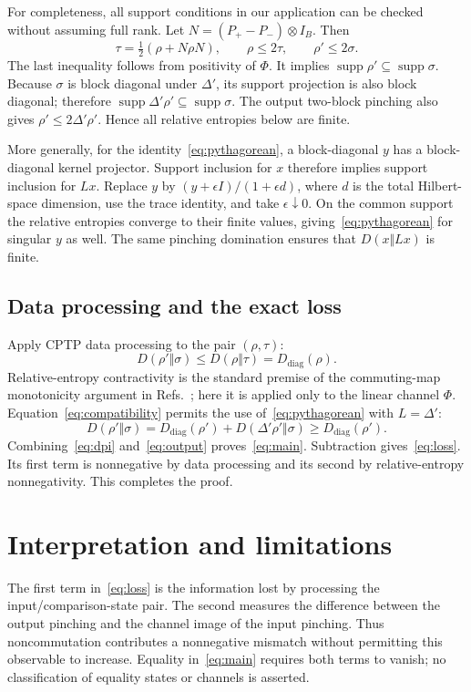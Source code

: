 \documentclass[12pt]{article}
\newcommand{\supp}{\operatorname{supp}}
\newcommand{\dd}{D_{\mathrm{diag}}}
\begin{document}
For completeness, all support conditions in our application can be checked without assuming full rank. Let $N=(P_+-P_-)\otimes I_B$. Then
\begin{equation}
 \tau=\tfrac12(\rho+N\rho N),\qquad
 \rho\leq2\tau,\qquad \rho'\leq2\sigma.
 \label{eq:domination}
\end{equation}
The last inequality follows from positivity of $\Phi$. It implies $\supp\rho'\subseteq\supp\sigma$. Because $\sigma$ is block diagonal under $\Delta'$, its support projection is also block diagonal; therefore $\supp\Delta'\rho'\subseteq\supp\sigma$. The output two-block pinching also gives $\rho'\leq2\Delta'\rho'$. Hence all relative entropies below are finite.

More generally, for the identity~\eqref{eq:pythagorean}, a block-diagonal $y$ has a block-diagonal kernel projector. Support inclusion for $x$ therefore implies support inclusion for $Lx$. Replace $y$ by $(y+\epsilon I)/(1+\epsilon d)$, where $d$ is the total Hilbert-space dimension, use the trace identity, and take $\epsilon\downarrow0$. On the common support the relative entropies converge to their finite values, giving~\eqref{eq:pythagorean} for singular $y$ as well. The same pinching domination ensures that $D(x\Vert Lx)$ is finite.

\subsection{Data processing and the exact loss}
Apply CPTP data processing to the pair $(\rho,\tau)$:
\begin{equation}
 D(\rho'\Vert\sigma)\leq D(\rho\Vert\tau)=\dd(\rho).
 \label{eq:dpi}
\end{equation}
Relative-entropy contractivity is the standard premise of the commuting-map monotonicity argument in Refs.~\cite{Liu2019,Liu2017}; here it is applied only to the linear channel $\Phi$. Equation~\eqref{eq:compatibility} permits the use of~\eqref{eq:pythagorean} with $L=\Delta'$:
\begin{equation}
 D(\rho'\Vert\sigma)=\dd(\rho')+D(\Delta'\rho'\Vert\sigma)
 \geq\dd(\rho').
 \label{eq:output}
\end{equation}
Combining~\eqref{eq:dpi} and~\eqref{eq:output} proves~\eqref{eq:main}. Subtraction gives~\eqref{eq:loss}. Its first term is nonnegative by data processing and its second by relative-entropy nonnegativity. This completes the proof.

\section{Interpretation and limitations}
The first term in~\eqref{eq:loss} is the information lost by processing the input/comparison-state pair. The second measures the difference between the output pinching and the channel image of the input pinching. Thus noncommutation contributes a nonnegative mismatch without permitting this observable to increase. Equality in~\eqref{eq:main} requires both terms to vanish; no classification of equality states or channels is asserted.
\end{document}
